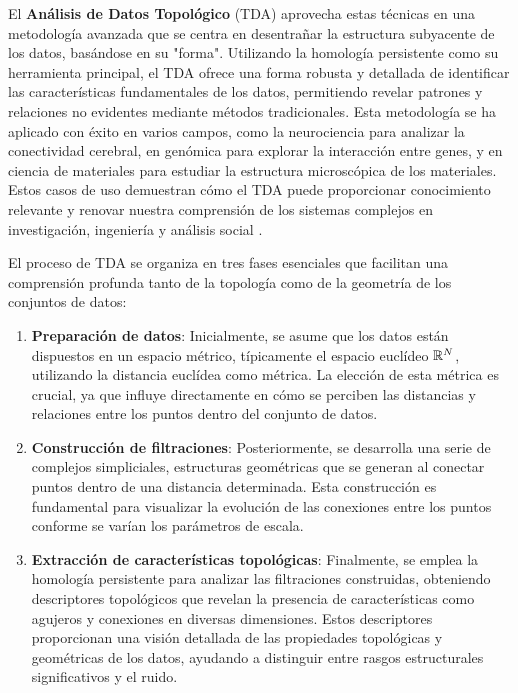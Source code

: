 El \textbf{Análisis de Datos Topológico} (TDA) aprovecha estas técnicas en una metodología avanzada que se centra en desentrañar la estructura subyacente de los datos, basándose en su "forma". Utilizando la homología persistente como su herramienta principal, el TDA ofrece una forma robusta y detallada de identificar las características fundamentales de los datos, permitiendo revelar patrones y relaciones no evidentes mediante métodos tradicionales. Esta metodología se ha aplicado con éxito en varios campos, como la neurociencia para analizar la conectividad cerebral, en genómica para explorar la interacción entre genes, y en ciencia de materiales para estudiar la estructura microscópica de los materiales. Estos casos de uso demuestran cómo el TDA puede proporcionar conocimiento relevante y renovar nuestra comprensión de los sistemas complejos en investigación, ingeniería y análisis social \cite{10.3389/frai.2021.667963}.

El proceso de TDA se organiza en tres fases esenciales que facilitan una comprensión profunda tanto de la topología como de la geometría de los conjuntos de datos:

\begin{enumerate}
	\item \textbf{Preparación de datos}: Inicialmente, se asume que los datos están dispuestos en un espacio métrico, típicamente el espacio euclídeo $\mathbb{R}^N$, utilizando la distancia euclídea como métrica. La elección de esta métrica es crucial, ya que influye directamente en cómo se perciben las distancias y relaciones entre los puntos dentro del conjunto de datos.
	
	\item \textbf{Construcción de filtraciones}: Posteriormente, se desarrolla una serie de complejos simpliciales, estructuras geométricas que se generan al conectar puntos dentro de una distancia determinada. Esta construcción es fundamental para visualizar la evolución de las conexiones entre los puntos conforme se varían los parámetros de escala.
	
	\item \textbf{Extracción de características topológicas}: Finalmente, se emplea la homología persistente para analizar las filtraciones construidas, obteniendo descriptores topológicos que revelan la presencia de características como agujeros y conexiones en diversas dimensiones. Estos descriptores proporcionan una visión detallada de las propiedades topológicas y geométricas de los datos, ayudando a distinguir entre rasgos estructurales significativos y el ruido.
\end{enumerate}

